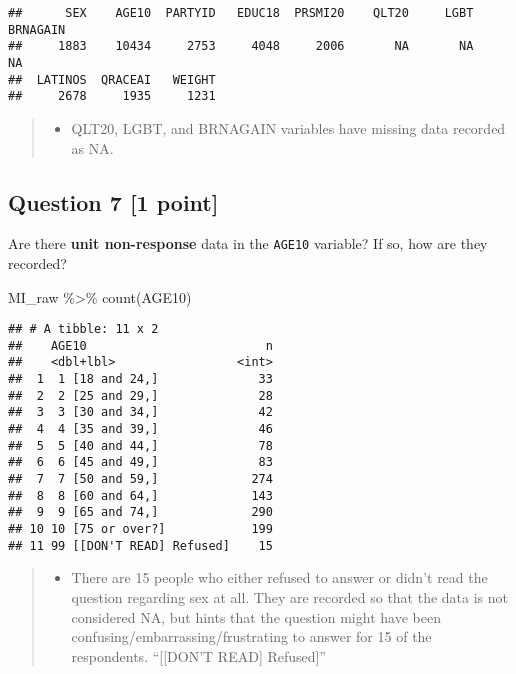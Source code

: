 \documentclass[
]{article}
\newenvironment{Shaded}{\begin{snugshade}}{\end{snugshade}}
\newcommand{\FunctionTok}[1]{\textcolor[rgb]{0.00,0.00,0.00}{#1}}
\newcommand{\NormalTok}[1]{#1}
\newcommand{\SpecialCharTok}[1]{\textcolor[rgb]{0.00,0.00,0.00}{#1}}
\providecommand{\tightlist}{%
  \setlength{\itemsep}{0pt}\setlength{\parskip}{0pt}}
\begin{document}
\begin{verbatim}
##      SEX    AGE10  PARTYID   EDUC18  PRSMI20    QLT20     LGBT BRNAGAIN 
##     1883    10434     2753     4048     2006       NA       NA       NA 
##  LATINOS  QRACEAI   WEIGHT 
##     2678     1935     1231
\end{verbatim}

\begin{quote}
\begin{itemize}
\tightlist
\item
  QLT20, LGBT, and BRNAGAIN variables have missing data recorded as NA.
\end{itemize}
\end{quote}

\hypertarget{question-7-1-point}{%
\subsection{Question 7 {[}1 point{]}}\label{question-7-1-point}}

Are there \textbf{unit non-response} data in the \texttt{AGE10}
variable? If so, how are they recorded?

\begin{Shaded}
\begin{Highlighting}[]
\NormalTok{MI\_raw }\SpecialCharTok{\%\textgreater{}\%}
  \FunctionTok{count}\NormalTok{(AGE10)}
\end{Highlighting}
\end{Shaded}

\begin{verbatim}
## # A tibble: 11 x 2
##    AGE10                         n
##    <dbl+lbl>                 <int>
##  1  1 [18 and 24,]              33
##  2  2 [25 and 29,]              28
##  3  3 [30 and 34,]              42
##  4  4 [35 and 39,]              46
##  5  5 [40 and 44,]              78
##  6  6 [45 and 49,]              83
##  7  7 [50 and 59,]             274
##  8  8 [60 and 64,]             143
##  9  9 [65 and 74,]             290
## 10 10 [75 or over?]            199
## 11 99 [[DON'T READ] Refused]    15
\end{verbatim}

\begin{quote}
\begin{itemize}
\tightlist
\item
  There are 15 people who either refused to answer or didn't read the
  question regarding sex at all. They are recorded so that the data is
  not considered NA, but hints that the question might have been
  confusing/embarrassing/frustrating to answer for 15 of the
  respondents. ``{[}{[}DON'T READ{]} Refused{]}''
\end{itemize}
\end{quote}
\end{document}
